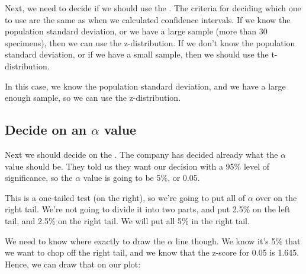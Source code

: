 \documentclass[../../../main.tex]{subfiles}
\begin{document}
Next, we need to decide if we should use the . The criteria for deciding which one to use are the same as when we calculated confidence intervals. If we know the population standard deviation, or we have a large sample (more than 30 specimens), then we can use the z-distribution. If we don't know the population standard deviation, or if we have a small sample, then we should use the t-distribution.

In this case, we know the population standard deviation, and we have a large enough sample, so we can use the z-distribution.


\subsection{Decide on an $\alpha$ value}

Next we should decide on the . The company has decided already what the $\alpha$ value should be. They told us they want our decision with a 95\% level of significance, so the $\alpha$ value is going to be 5\%, or 0.05.

This is a one-tailed test (on the right), so we're going to put all of $\alpha$ over on the right tail. We're not going to divide it into two parts, and put 2.5\% on the left tail, and 2.5\% on the right tail. We will put all 5\% in the right tail. 

We need to know where exactly to draw the $\alpha$ line though. We know it's 5\% that we want to chop off the right tail, and we know that the z-score for 0.05 is 1.645. Hence, we can draw that on our plot:

\begin{center}
\end{center}
\end{document}

